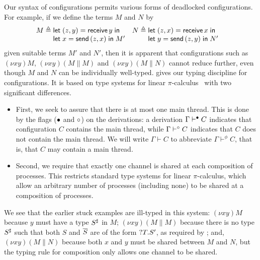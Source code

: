 \documentclass[oribibl,orivec,envcountsame]{llncs}
\begin{document}
Our syntax of configurations permits various forms of deadlocked configurations.  For example, if we
define the terms $M$ and $N$ by
\begin{align*}
  M &\defeq \bl
    \gvlet{(z,y)}{\gvreceive{y}}{} \\
    \gvlet{x}{\gvsend{(z,x)}}{M'} \el &
  N &\defeq \bl
    \gvlet{(z,x)}{\gvreceive{x}}{} \\
    \gvlet{y}{\gvsend{(z,y)}}{N'} \el
\end{align*}
given suitable terms $M'$ and $N'$, then it is apparent that configurations such as $(\nu xy)M$,
$(\nu xy)(M \parallel M)$ and $(\nu xy)(M \parallel N)$ cannot reduce further, even though $M$ and
$N$ can be individually well-typed.   gives our typing discipline for
configurations.  It is based on type systems for linear $\pi$-calculus~\cite{Kobayashi96} with two
significant differences.
\begin{itemize}
\item First, we seek to assure that there is at most one main thread.  This is done by the flags
  (${\mathord{\bullet}}$ and ${\mathord{\circ}}$) on the derivations: a derivation $\Gamma \vdash^{\mathord{\bullet}} C$ indicates that
  configuration $C$ contains the main thread, while $\Gamma \vdash^{\mathord{\circ}} C$ indicates that $C$ does
  not contain the main thread.  We will write $\Gamma \vdash C$ to abbreviate $\Gamma \vdash^\phi
  C$, that is, that $C$ may contain a main thread.
\item Second, we require that exactly one channel is shared at each composition of processes.  This
  restricts standard type systems for linear $\pi$-calculus, which allow an arbitrary number of
  processes (including none) to be shared at a composition of processes.
\end{itemize}
We see that the earlier stuck examples are ill-typed in this system: $(\nu xy)M$ because $y$ must
have a type $S^\sharp$ in $M$; $(\nu xy)(M \parallel M)$ because there is no type $S^\sharp$
such that both $S$ and $\overline{S}$ are of the form ${?T.S'}$, as required by
; and, $(\nu xy)(M \parallel N)$ because both $x$ and $y$ must be shared between
$M$ and $N$, but the typing rule for composition only allows one channel to be shared.
\end{document}
